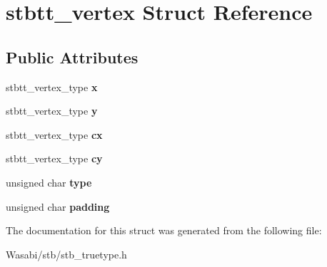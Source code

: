 \hypertarget{structstbtt__vertex}{}\section{stbtt\+\_\+vertex Struct Reference}
\label{structstbtt__vertex}
\subsection*{Public Attributes}
\begin{DoxyCompactItemize}
\item 
stbtt\+\_\+vertex\+\_\+type {\bfseries x}\hypertarget{structstbtt__vertex_a81773edbe760d0e090561a3c1e86c919}{}\label{structstbtt__vertex_a81773edbe760d0e090561a3c1e86c919}

\item 
stbtt\+\_\+vertex\+\_\+type {\bfseries y}\hypertarget{structstbtt__vertex_a9052065ca544b63d537325b246928cfc}{}\label{structstbtt__vertex_a9052065ca544b63d537325b246928cfc}

\item 
stbtt\+\_\+vertex\+\_\+type {\bfseries cx}\hypertarget{structstbtt__vertex_a43835489e2a151b31cb100d20f8adeae}{}\label{structstbtt__vertex_a43835489e2a151b31cb100d20f8adeae}

\item 
stbtt\+\_\+vertex\+\_\+type {\bfseries cy}\hypertarget{structstbtt__vertex_a5610d6335aa6962d970fc7fd2225545e}{}\label{structstbtt__vertex_a5610d6335aa6962d970fc7fd2225545e}

\item 
unsigned char {\bfseries type}\hypertarget{structstbtt__vertex_aa325b3707b88e7e104c0de46bb2bf395}{}\label{structstbtt__vertex_aa325b3707b88e7e104c0de46bb2bf395}

\item 
unsigned char {\bfseries padding}\hypertarget{structstbtt__vertex_a8bd328747e8ea018612960a52e3e3ede}{}\label{structstbtt__vertex_a8bd328747e8ea018612960a52e3e3ede}

\end{DoxyCompactItemize}


The documentation for this struct was generated from the following file\+:\begin{DoxyCompactItemize}
\item 
Wasabi/stb/stb\+\_\+truetype.\+h\end{DoxyCompactItemize}
